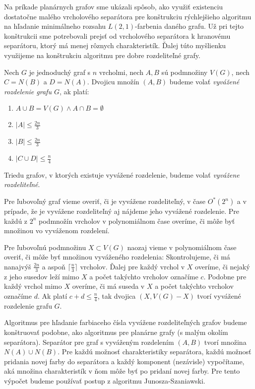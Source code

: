 Na príkade planárnych grafov sme ukázali spôsob, ako využiť existenciu dostatočne malého vrcholového
separátora pre konštrukciu rýchlejšieho algoritmu na hľadanie minimálneho rozsahu $L(2,1)$-farbenia
daného grafu. Už pri tejto konštrukcii sme potrebovali prejsť od vrcholového separátora k hranovému
separátoru, ktorý má menej rôznych charakteristík. Ďalej túto myšlienku využijeme na konštrukciu
algoritmu pre dobre rozdeliteľné grafy.

\begin{defn}
    Nech $G$ je jednoduchý graf s $n$ vrcholmi, nech $A, B$ sú podmnožiny $V(G)$,
    nech $C = N(B)$ a $D = N(A)$. Dvojicu množín $(A,B)$ budeme volať \emph{vyvážené rozdelenie
    grafu $G$}, ak platí:
    \begin{enumerate}
        \item $A \cup B = V(G) \wedge A \cap B = \emptyset$
        \item $|A| \leq \frac{2n}{3}$
        \item $|B| \leq \frac{2n}{3}$
        \item $|C \cup D| \leq \frac{n}{4}$
    \end{enumerate}

    Triedu grafov, v ktorých existuje vyvážené rozdelenie, budeme volať \emph{vyvážene rozdeliteľné}.
\end{defn}

Pre ľubovoľný graf vieme overiť, či je vyvážene rozdeliteľný, v čase $O^*(2^n)$ a v prípade, že je
vyvážene rozdeliteľný aj nájdeme jeho vyvážené rozdelenie. Pre každú z $2^n$ podmnožín vrcholov
v polynomiálnom čase overíme, či môže byť množinou vo vyváženom rozdelení.

Pre ľubovoľnú podmnožinu $X \subset V(G)$ naozaj vieme
v polynomiálnom čase overiť, či môže byť množinou vyváženého rozdelenia: Skontrolujeme, či má
nanajvýš $\frac{2n}{3}$ a aspoň $\lceil \frac{n}{3} \rceil$ vrcholov. Ďalej pre každý vrchol v $X$
overíme, či nejaký z jeho susedov leží mimo $X$ a počet takýchto vrcholov označíme $c$. Podobne
pre každý vrchol mimo $X$ overíme, či má suseda v $X$ a počet takýchto vrcholov označíme $d$. Ak
platí $c + d \leq \frac{n}{4}$, tak dvojica $(X, V(G) - X)$ tvorí vyvážené rozdelenie grafu $G$.

Algoritmus pre hľadanie farbiaceho čísla vyvážene rozdeliteľných grafov budeme konštruovať podobne, ako
algoritmus pre planárne grafy (s malým okolím separátora). Separátor pre graf s vyváženým rozdelením
$(A,B)$ tvorí množina $N(A) \cup N(B)$. Pre každú možnosť charakteristiky separátora,
každú možnosť pridania novej farby do separátora a každý komponent (nezávisle) vypočítame, aká
množina charakteristík v ňom môže byť po pridaní novej farby. Pre tento výpočet budeme používať
postup z algoritmu Junosza-Szaniawski.

